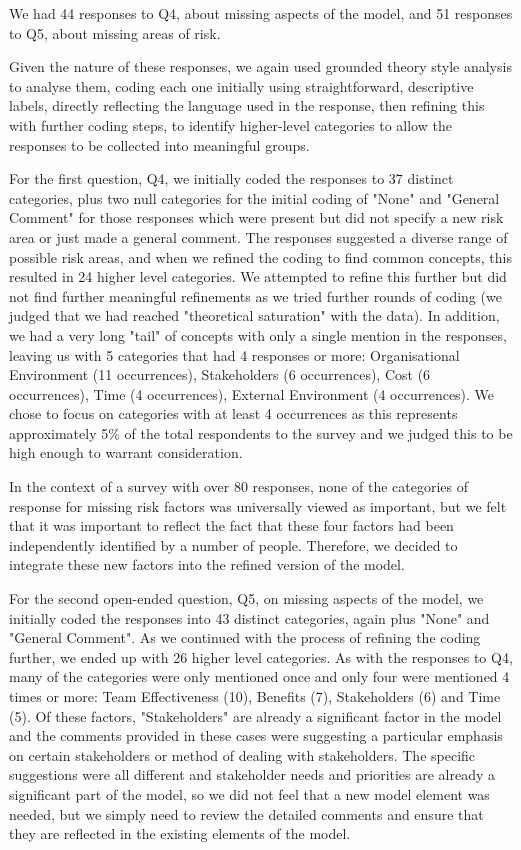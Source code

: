 We had 44 responses to Q4, about missing aspects of the model, and 51 responses to Q5, about missing areas of risk.

Given the nature of these responses, we again used grounded theory style analysis to analyse them, coding each one initially using straightforward, descriptive labels, directly reflecting the language used in the response, then refining this with further coding steps, to identify higher-level categories to allow the responses to be collected into meaningful groups.

For the first question, Q4, we initially coded the responses to 37 distinct categories, plus two null categories for the initial coding of "None" and "General Comment" for those responses which were present but did not specify a new risk area or just made a general comment.  The responses suggested a diverse range of possible risk areas, and when we refined the coding to find common concepts, this resulted in 24 higher level categories.  We attempted to refine this further but did not find further meaningful refinements as we tried further rounds of coding (we judged that we had reached "theoretical saturation" with the data).   In addition, we had a very long "tail" of concepts with only a single mention in the responses, leaving us with 5 categories that had 4 responses or more: Organisational Environment (11 occurrences), Stakeholders (6 occurrences), Cost (6 occurrences), Time (4 occurrences), External Environment (4 occurrences).  We chose to focus on categories with at least 4 occurrences as this represents approximately 5\% of the total respondents to the survey and we judged this to be high enough to warrant consideration.

In the context of a survey with over 80 responses, none of the categories of response for missing risk factors was universally viewed as important, but we felt that it was important to reflect the fact that these four factors had been independently identified by a number of people.  Therefore, we decided to integrate these new factors into the refined version of the model.

For the second open-ended question, Q5, on missing aspects of the model, we initially coded the responses into 43 distinct categories, again plus "None" and "General Comment".  As we continued with the process of refining the coding further, we ended up with 26 higher level categories.  As with the responses to Q4, many of the categories were only mentioned once and only four were mentioned 4 times or more: Team Effectiveness (10), Benefits (7), Stakeholders (6) and Time (5).  Of these factors, "Stakeholders" are already a significant factor in the model and the comments provided in these cases were suggesting a particular emphasis on certain stakeholders or method of dealing with stakeholders.  The specific suggestions were all different and stakeholder needs and priorities are already a significant part of the model, so we did not feel that a new model element was needed, but we simply need to review the detailed comments and ensure that they are reflected in the existing elements of the model.

